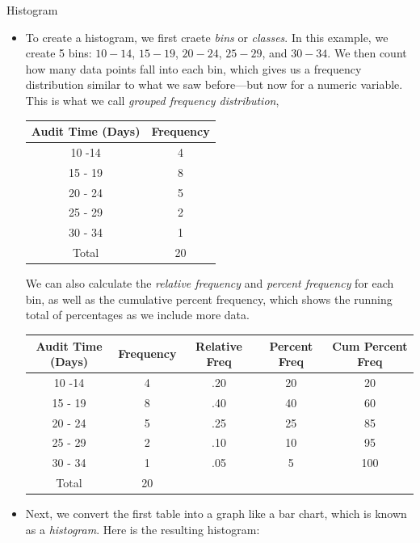 \documentclass[8pt, usepdftitle=false]{beamer}
\begin{document}
\begin{frame}[allowframebreaks]{Histogram}
\begin{itemize}
\item  To create a histogram, we first craete \emph{bins} or \emph{classes}. In this example, we create 5 bins: $10-14$, $15-19$, $20-24$, $25-29$, and $30-34$. We then count how many data points fall into each bin, which gives us a frequency distribution similar to what we saw before—but now for a numeric variable. This is what we call \emph{grouped frequency distribution},


    \begin{table}


    \begin{tabular}{c|c}
      \hline Audit Time (Days) & Frequency   \\
      \hline 10 -14 & 4 \\
      \hline 15 - 19 & 8  \\
      \hline 20 - 24 & 5  \\
      \hline 25 - 29 & 2  \\
      \hline 30 - 34 & 1  \\
      \hline Total & 20 \\
      \hline
\end{tabular}
  \end{table}


We can also calculate the \emph{relative frequency} and \emph{percent frequency} for each bin, as well as the \alert{cumulative percent frequency}, which shows the running total of percentages as we include more data.




    \begin{table}


    \begin{tabular}{c|c|c|c|c}
      \hline Audit Time (Days) & Frequency & Relative Freq & Percent Freq & Cum Percent Freq  \\
      \hline 10 -14 & 4 & .20 & 20 & 20  \\
      \hline 15 - 19 & 8 & .40 & 40 & 60 \\
      \hline 20 - 24 & 5 & .25 & 25 & 85 \\
      \hline 25 - 29 & 2 & .10 & 10 & 95 \\
      \hline 30 - 34 & 1 & .05 & 5 & 100 \\
      \hline Total & 20 \\
      \hline
\end{tabular}
  \end{table}


\farmebreak

\item Next, we convert the first table into a graph like a bar chart, which is known as a \emph{histogram}. Here is the resulting histogram:


\end{itemize}
\end{frame}
\end{document}
